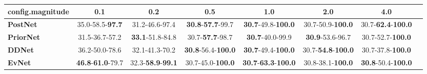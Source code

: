 \begin{tabular}{lccccccc}
\toprule
\textbf{config.magnitude} &                               0.1 &                               0.2 &                                0.5 &                                         1.0 &                                2.0 &                                4.0 \\
\midrule
\textbf{PostNet } &           35.0-58.5-\textbf{97.7} &                    31.2-46.6-97.4 &   \textbf{30.8}-\textbf{57.7}-99.7 &           \textbf{30.7}-49.8-\textbf{100.0} &           30.7-50.9-\textbf{100.0} &  30.7-\textbf{62.4}-\textbf{100.0} \\
\textbf{PriorNet} &                    31.5-36.7-57.2 &           \textbf{33.1}-51.8-84.8 &            30.7-\textbf{57.7}-98.7 &                     \textbf{30.7}-40.0-99.9 &            \textbf{30.9}-53.6-96.7 &           30.7-52.7-\textbf{100.0} \\
\textbf{DDNet   } &                    36.2-50.0-78.6 &                    32.1-41.3-70.2 &  \textbf{30.8}-56.4-\textbf{100.0} &           \textbf{30.7}-49.4-\textbf{100.0} &  30.7-\textbf{54.8}-\textbf{100.0} &           30.7-37.8-\textbf{100.0} \\
\textbf{EvNet   } &  \textbf{46.8}-\textbf{61.0}-79.7 &  32.3-\textbf{58.9}-\textbf{99.1} &           30.7-45.0-\textbf{100.0} &  \textbf{30.7}-\textbf{63.3}-\textbf{100.0} &           30.8-38.1-\textbf{100.0} &  \textbf{30.8}-50.4-\textbf{100.0} \\
\bottomrule
\end{tabular}
